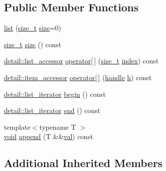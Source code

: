 \subsection*{Public Member Functions}
\begin{DoxyCompactItemize}
\item 
\mbox{\hyperlink{classlist_a605b8e11c689100c84d14f1e8f3ec5ba}{list}} (\mbox{\hyperlink{detail_2common_8h_a801d6a451a01953ef8cbae6feb6a3638}{size\+\_\+t}} \mbox{\hyperlink{_s_d_l__opengl__glext_8h_a3d1e3edfcf61ca2d831883e1afbad89e}{size}}=0)
\item 
\mbox{\hyperlink{detail_2common_8h_a801d6a451a01953ef8cbae6feb6a3638}{size\+\_\+t}} \mbox{\hyperlink{classlist_a8fcc9151a36f5802b0ec7d42a0b592f6}{size}} () const
\item 
\mbox{\hyperlink{pytypes_8h_ad3aeae242a70c970305503390f417317}{detail\+::list\+\_\+accessor}} \mbox{\hyperlink{classlist_aab85ae5bde0b7e32e2f31de39a80b6e8}{operator\mbox{[}$\,$\mbox{]}}} (\mbox{\hyperlink{detail_2common_8h_a801d6a451a01953ef8cbae6feb6a3638}{size\+\_\+t}} \mbox{\hyperlink{_s_d_l__opengl__glext_8h_a57f14e05b1900f16a2da82ade47d0c6d}{index}}) const
\item 
\mbox{\hyperlink{pytypes_8h_a9907d3edf962653e33d36bccc8b8a268}{detail\+::item\+\_\+accessor}} \mbox{\hyperlink{classlist_ab71068000935a82764ec026dba392b1e}{operator\mbox{[}$\,$\mbox{]}}} (\mbox{\hyperlink{classhandle}{handle}} \mbox{\hyperlink{_s_d_l__opengl__glext_8h_afa0fb1b5e976920c0abeff2dca3ed774}{h}}) const
\item 
\mbox{\hyperlink{pytypes_8h_a185da221b77a3f194e5764f8b6babb1d}{detail\+::list\+\_\+iterator}} \mbox{\hyperlink{classlist_a64e9fbac58507bf5ee4683bb0d5b6862}{begin}} () const
\item 
\mbox{\hyperlink{pytypes_8h_a185da221b77a3f194e5764f8b6babb1d}{detail\+::list\+\_\+iterator}} \mbox{\hyperlink{classlist_a3de409f3499b5c3e27502a1bb79ea45a}{end}} () const
\item 
{\footnotesize template$<$typename T $>$ }\\\mbox{\hyperlink{_s_d_l__opengles2__gl2ext_8h_ae5d8fa23ad07c48bb609509eae494c95}{void}} \mbox{\hyperlink{classlist_a150b194a333339dc1f248dff200adaf8}{append}} (T \&\&\mbox{\hyperlink{_s_d_l__opengl__glext_8h_a26942fd2ed566ef553eae82d2c109c8f}{val}}) const
\end{DoxyCompactItemize}
\subsection*{Additional Inherited Members}


